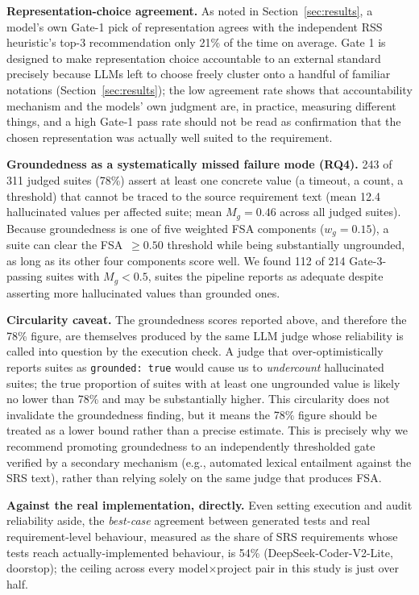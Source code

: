 \documentclass[conference]{IEEEtran}
\begin{document}
  \textbf{Representation-choice agreement.} As noted in
  Section~\ref{sec:results}, a model's own Gate-1 pick of representation agrees
  with the independent RSS heuristic's top-3 recommendation only 21\% of the
  time on average. Gate 1 is designed to make representation choice
  accountable to an external standard precisely because LLMs left to choose
  freely cluster onto a handful of familiar notations
  (Section~\ref{sec:results}); the low agreement rate shows that accountability
  mechanism and the models' own judgment are, in practice, measuring different
  things, and a high Gate-1 pass rate should not be read as confirmation that
  the chosen representation was actually well suited to the requirement.

  \textbf{Groundedness as a systematically missed failure mode (RQ4).} 243 of
  311 judged suites (78\%) assert at least one concrete value (a timeout, a count, a
  threshold) that cannot be traced to the source requirement text (mean 12.4
  hallucinated values per affected suite; mean $M_g=0.46$ across all judged
  suites). Because groundedness is one of five weighted FSA components
  ($w_g=0.15$), a suite can clear the FSA~$\geq 0.50$ threshold while being
  substantially ungrounded, as long as its other four components score well.
  We found 112 of 214 Gate-3-passing suites with $M_g<0.5$, suites the
  pipeline reports as adequate despite asserting more hallucinated values than
  grounded ones.

  \textbf{Circularity caveat.} The groundedness scores reported above, and
  therefore the 78\% figure, are themselves produced by the same LLM judge
  whose reliability is called into question by the execution check. A judge that
  over-optimistically reports suites as \texttt{grounded: true} would cause
  us to \emph{undercount} hallucinated suites; the true proportion of suites
  with at least one ungrounded value is likely no lower than 78\% and may be
  substantially higher. This circularity does not invalidate the groundedness
  finding, but it means the 78\% figure should be treated as a lower bound
  rather than a precise estimate. This is precisely why we recommend promoting
  groundedness to an independently thresholded gate verified by a secondary
  mechanism (e.g., automated lexical entailment against the SRS text), rather
  than relying solely on the same judge that produces FSA.

  \textbf{Against the real implementation, directly.} Even setting execution
  and audit reliability aside, the \emph{best-case} agreement between generated
  tests and real requirement-level behaviour, measured as the share of SRS
  requirements whose tests reach actually-implemented behaviour, is 54\%
  (DeepSeek-Coder-V2-Lite, doorstop); the ceiling across every
  model$\times$project pair in this study is just over half.
\end{document}
